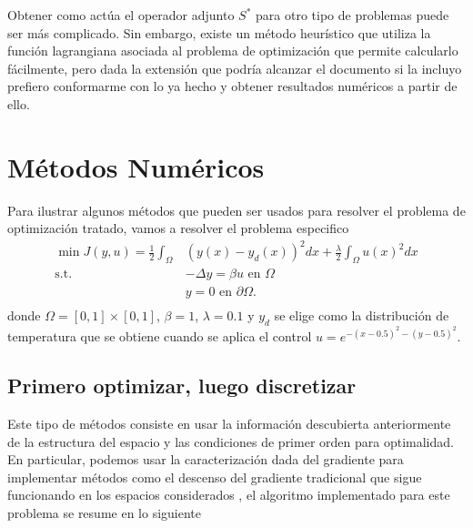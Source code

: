 \documentclass{article}
\begin{document}
\noindent
Obtener como actúa el operador adjunto $S^{*}$ para otro tipo de problemas puede ser más complicado. Sin embargo, existe un método heurístico que utiliza la función lagrangiana asociada al problema de optimización que permite calcularlo fácilmente, pero dada la extensión que podría alcanzar el documento si la incluyo prefiero conformarme con lo ya hecho y obtener resultados numéricos a partir de ello.

\section{Métodos Numéricos}
Para ilustrar algunos métodos que pueden ser usados para resolver el problema de optimización tratado, vamos a resolver el problema especifico
\begin{equation}
\label{prom3}
    \begin{split}
        \min J(y,u)=\frac{1}{2}\int_{\Omega}&(y(x)-y_d(x))^2dx+\frac{\lambda}{2}\int_{\Omega}u(x)^2dx\\
        \text{s.t.  }& -\Delta y=\beta u \text{ en } \Omega\\
        &y=0 \text{  en   }\partial\Omega.\\
    \end{split}
\end{equation}
donde $\Omega=[0,1]\times [0,1]$, $\beta=1 $, $\lambda=0.1$ y $y_d$ se elige como la distribución de temperatura que se obtiene cuando se aplica el control $u=e^{-(x-0.5)^2-(y-0.5)^2}$.
\subsection{Primero optimizar, luego discretizar}
Este tipo de métodos consiste en usar la información descubierta anteriormente de la estructura del espacio y las condiciones de primer orden para optimalidad. En particular, podemos usar la caracterización dada del gradiente para implementar métodos como el descenso del gradiente tradicional que sigue funcionando en los espacios considerados , el algoritmo implementado para este problema se resume en lo siguiente\\
\end{document}
